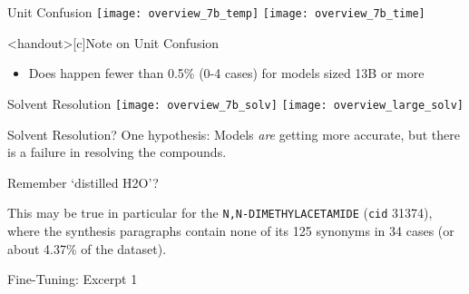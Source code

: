 \begin{frame}{Unit Confusion}
    \pause
    \texttt{[image: overview\_7b\_temp]}
    \texttt{[image: overview\_7b\_time]}
\end{frame}

\begin{frame}<handout>[c]{Note on Unit Confusion}
    \Large 
    \begin{itemize}
        \item Does happen fewer than 0.5\% (0-4 cases) for models sized 13B or more
    \end{itemize}
\end{frame}

\begin{frame}{Solvent Resolution}
    \centering
    \texttt{[image: overview\_7b\_solv]}
    \texttt{[image: overview\_large\_solv]}
\end{frame}


\begin{frame}[c]{Solvent Resolution?}
    \large
    One hypothesis: Models \textit{are} getting more accurate, but there is a failure in resolving the compounds.

    \vspace{2em}
    \pause

    Remember `distilled H2O'?

    \vspace{2em}
    \pause

    This may be true in particular for the \tsolv \texttt{N,N-DIMETHYLACETAMIDE} (\texttt{cid} 31374), where the synthesis paragraphs contain none of its 125 synonyms in 34 cases (or about 4.37\% of the dataset). 
\end{frame}

\begin{frame}[c]{Fine-Tuning: Excerpt 1}
\end{frame}


